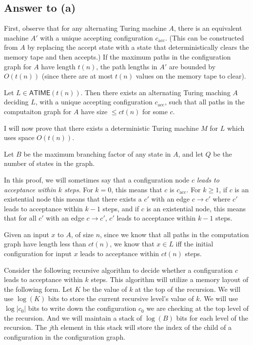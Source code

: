 \documentclass{article}
\def \ATIME{{\mathsf{ATIME}}}
\begin{document}
\subsection*{Answer to (a)}
First, observe that for any alternating Turing machine $A$, there is an equivalent machine $A'$ with a unique accepting configuration $c_\text{acc}$.  (This can be constructed from $A$ by replacing the accept state with a state that deterministically clears the memory tape and then accepts.)  If the maximum paths in the configuration graph for $A$ have length $t(n)$, the path lengths in $A'$ are bounded by $O(t(n))$ (since there are at most $t(n)$ values on the memory tape to clear).

Let $L \in \ATIME(t(n))$.  Then there exists an alternating Turing maching $A$ deciding $L$, with a unique accepting configuration $c_\text{acc}$, such that all paths in the computaiton graph for $A$ have size $\leq c t(n)$ for some $c$.

I will now prove that there exists a deterministic Turing machine $M$ for $L$ which uses space $O(t(n))$.

Let $B$ be the maximum branching factor of any state in $A$, and let $Q$ be the number of states in the graph.

In this proof, we will sometimes say that a configuration node $c$ \textit{leads to acceptance within $k$ steps}.  For $k = 0$, this means that $c$ is $c_\text{acc}$.  For $k \geq 1$, if $c$ is an existential node this means that there exists a $c'$ with an edge $c \to c'$ where $c'$ leads to acceptance within $k - 1$ steps, and if $c$ is an existential node, this means that for all $c'$ with an edge $c \to c'$, $c'$ leads to acceptance within $k - 1$ steps.

Given an input $x$ to $A$, of size $n$, since we know that all paths in the computation graph have length less than $c t(n)$, we know that $x \in L$ iff the initial configuration for input $x$ leads to acceptance within $c t(n)$ steps.

Consider the following recursive algorithm to decide whether a configuration $c$ leads to acceptance within $k$ steps.  This algorithm will utilize a memory layout of the following form.  Let $K$ be the value of $k$ at the top of the recursion.  We will use $\log(K)$ bits to store the current recursive level's value of $k$.  We will use $\log |c_0|$ bits to write down the configuration $c_0$ we are checking at the top level of the recursion.  And we will maintain a stack of $\log(B)$ bits for each level of the recursion.  The $j$th element in this stack will store the index of the child of a configuration in the configuration graph.
\end{document}
